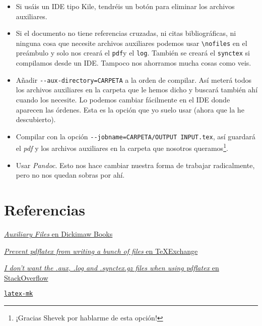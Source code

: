 \begin{itemize}
\item
  Si usáis un IDE tipo Kile, tendréis un botón para eliminar los
  archivos auxiliares.
\item
  Si el documento no tiene referencias cruzadas, ni citas
  bibliográficas, ni ninguna cosa que necesite archivos auxiliares
  podemos usar \lstinline!\nofiles! en el preámbulo y solo nos creará el
  \lstinline!pdf!y el \lstinline!log!. También se creará el
  \lstinline!synctex! si compilamos desde un IDE. Tampoco nos ahorramos
  mucha cosas como veis.
\item
  Añadir \lstinline!--aux-directory=CARPETA! a la orden de compilar. Así
  meterá todos los archivos auxiliares en la carpeta que le hemos dicho
  y buscará también ahí cuando los necesite. Lo podemos cambiar
  fácilmente en el IDE donde aparecen las órdenes. Esta es la opción que
  yo suelo usar (ahora que la he descubierto).
\item
  Compilar con la opción \lstinline!--jobname=CARPETA/OUTPUT INPUT.tex!,
  así guardará el \emph{pdf} y los archivos auxiliares en la carpeta que
  nosotros queramos\footnote{¡Gracias Shevek por hablarme de esta
    opción!}.
\item
  Usar \emph{Pandoc}. Esto nos hace cambiar nuestra forma de trabajar
  radicalmente, pero no nos quedan sobras por ahí.
\end{itemize}

\section{Referencias}

\href{http://www.dickimaw-books.com/latex/novices/html/auxiliary.html}{\emph{Auxiliary
Files} en Dickimaw Books}

\href{http://tex.stackexchange.com/questions/11123/prevent-pdflatex-from-writing-a-bunch-of-files}{\emph{Prevent
pdflatex from writing a bunch of files} en TeXExchange}

\href{http://stackoverflow.com/questions/3745908/i-dont-want-the-aux-log-and-synctex-gz-files-when-using-pdflatex}{\emph{I
don't want the .aux, .log and .synctex.gz files when using pdflatex} en
StackOverflow}

\href{http://latex-mk.sourceforge.net/}{\lstinline!latex-mk!}
